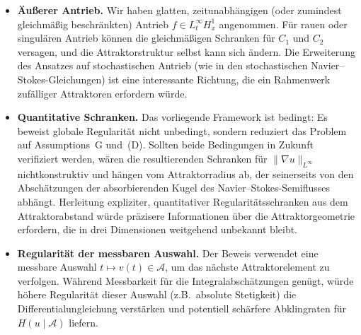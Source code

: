 \documentclass[12pt,a4paper]{article}
\theoremstyle{definition}
\theoremstyle{plain}
\theoremstyle{remark}
\begin{document}
\begin{itemize}
    \item \textbf{Äußerer Antrieb.} Wir haben glatten, zeitunabhängigen (oder zumindest gleichmäßig beschränkten) Antrieb $f \in L^\infty_t H^1_x$ angenommen. Für rauen oder singulären Antrieb können die gleichmäßigen Schranken für $C_1$ und $C_2$ versagen, und die Attraktorstruktur selbst kann sich ändern. Die Erweiterung des Ansatzes auf stochastischen Antrieb (wie in den stochastischen Navier--Stokes-Gleichungen) ist eine interessante Richtung, die ein Rahmenwerk zufälliger Attraktoren erfordern würde.

    \item \textbf{Quantitative Schranken.} Das vorliegende Framework ist bedingt: Es beweist globale Regularität nicht unbedingt, sondern reduziert das Problem auf Assumptions~G und~(D). Sollten beide Bedingungen in Zukunft verifiziert werden, wären die resultierenden Schranken für $\|\nabla u\|_{L^\infty}$ nichtkonstruktiv und hängen vom Attraktorradius ab, der seinerseits von den Abschätzungen der absorbierenden Kugel des Navier--Stokes-Semiflusses abhängt. Herleitung expliziter, quantitativer Regularitätsschranken aus dem Attraktorabstand würde präzisere Informationen über die Attraktorgeometrie erfordern, die in drei Dimensionen weitgehend unbekannt bleibt.

    \item \textbf{Regularität der messbaren Auswahl.} Der Beweis verwendet eine messbare Auswahl $t \mapsto v(t) \in \mathcal{A}$, um das nächste Attraktorelement zu verfolgen. Während Messbarkeit für die Integralabschätzungen genügt, würde höhere Regularität dieser Auswahl (z.B.\ absolute Stetigkeit) die Differentialungleichung verstärken und potentiell schärfere Abklingraten für $H(u \mid \mathcal{A})$ liefern.
\end{itemize}
\end{document}
